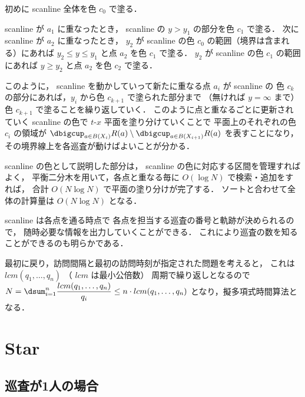 初めに scanline 全体を色 $c_0$ で塗る．

scanline が $a_1$ に重なったとき，
scanline の $y > y_1$ の部分を色 $c_1$ で塗る．
次に scanline が $a_2$ に重なったとき，
$y_2$ が scanline の色 $c_0$ の範囲（境界は含まれる）にあれば
$y_2 \leq y \leq y_1$ と点 $a_2$ を色 $c_1$ で塗る．
$y_2$ が scanline の色 $c_1$ の範囲にあれば
$y \geq y_2$ と点 $a_2$ を色 $c_2$ で塗る．


このように，
scanline を動かしていって新たに重なる点 $a_i$ が scanline の
色 $c_k$ の部分にあれば，$y_i$ から色 $c_{k + 1}$ で塗られた部分まで
（無ければ $y = \infty$ まで）色 $c_{k + 1}$ で塗ることを繰り返していく．
このように点と重なるごとに更新されていく scanline の色で $t$-$x$ 平面を塗り分けていくことで
平面上のそれぞれの色 $c_i$ の領域が
$\dbigcup_{a \in B(X_i)} R(a) \setminus \dbigcup_{a \in B(X_{i + 1})} R(a)$
を表すことになり，
その境界線上を各巡査が動けばよいことが分かる．

scanline の色として説明した部分は，
scanline の色に対応する区間を管理すればよく，
平衡二分木を用いて，各点と重なる毎に $O(\log N)$ で検索・追加をすれば，
合計 $O(N \log N)$ で平面の塗り分けが完了する．
ソートと合わせて全体の計算量は $O(N \log N)$ となる．

scanline は各点を通る時点で
各点を担当する巡査の番号と軌跡が決められるので，
随時必要な情報を出力していくことができる．
これにより巡査の数を知ることができるのも明らかである．

最初に戻り，訪問間隔と最初の訪問時刻が指定された問題を考えると，
これは $lcm(q_1, \ldots, q_n)$ （ $lcm$ は最小公倍数） 周期で繰り返しとなるので
$N = \dsum_{i = 1}^n \dfrac{lcm(q_1, \ldots, q_n)}{q_i} \leq n \cdot lcm(q_1, \ldots, q_n)$
となり，擬多項式時間算法となる．









\section{Star}


\subsection{巡査が1人の場合}

